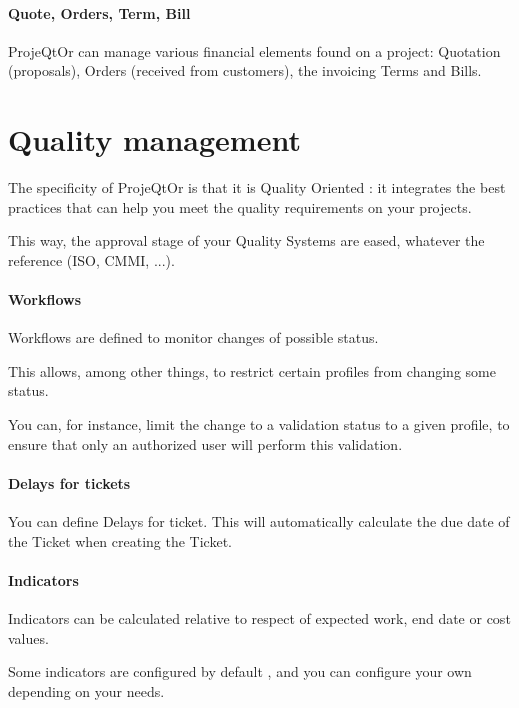 \documentclass[letterpaper,10pt,english]{sphinxmanual}
\begin{document}
\paragraph{Quote, Orders, Term, Bill}

ProjeQtOr  can manage various financial elements found on a project: Quotation (proposals), Orders (received from customers), the invoicing Terms and Bills.
\newpage
{}

\section{Quality management}
\label{Features:quality-management}\label{Features:index-24}
The specificity of ProjeQtOr  is that it is Quality Oriented : it integrates the best practices that can help you meet the quality requirements on your projects.

This way, the approval stage of your Quality Systems are eased, whatever the reference (ISO, CMMI, ...).

\paragraph{Workflows}

Workflows are defined to monitor changes of possible status.

This allows, among other things, to restrict certain profiles from changing some status.

You can, for instance, limit the change to a validation status to a given profile, to ensure that only an authorized user will perform this validation.

\paragraph{Delays for tickets}

You can define Delays for ticket. This will automatically calculate the due date of the Ticket when creating the Ticket.

\paragraph{Indicators}

Indicators can be calculated relative to respect of expected work, end date or cost values.

Some indicators are configured by default , and you can configure your own depending on your needs.
\end{document}
